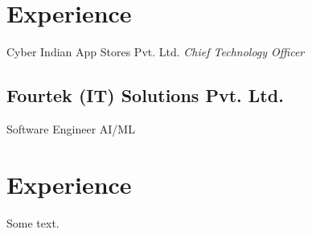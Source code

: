 \documentclass[paper=a4,fontsize=11pt]{scrartcl}%
\begin{document}
\section{Experience}%
\label{sec:Experience}%
Cyber Indian App Stores Pvt. Ltd.%
\textit{Chief Technology Officer}%
\subsection{Fourtek (IT) Solutions Pvt. Ltd.}%
\label{subsec:Fourtek (IT) Solutions Pvt. Ltd.}%
Software Engineer AI/ML

%
%
\section{Experience}%
\label{sec:Experience}%
Some text.

%
\end{document}
